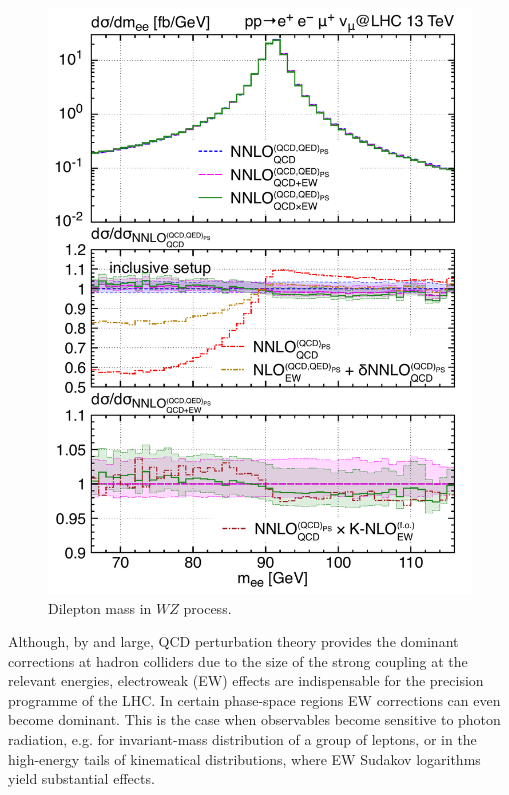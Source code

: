\documentclass{FBR_Bericht_2025}
\begin{document}
\begin{refsection}
\begin{figure}[b!]
\begin{center}
\includegraphics[width=0.95\linewidth]{plots/MiNNLO_EW_WZ_mZ.pdf}
\caption{Dilepton mass in $WZ$ process.}
\label{fig:WZ}
\end{center}
\end{figure}

Although, by and large, 
QCD perturbation theory provides the dominant corrections at hadron 
colliders due to the size of the strong coupling at the relevant energies, 
electroweak (EW) effects are indispensable for the precision programme of the LHC.
In certain phase-space regions EW corrections can even become dominant. This is the case
when observables become sensitive to photon radiation, e.g. for invariant-mass 
distribution of a group of leptons, or in the high-energy tails of kinematical distributions,
where EW Sudakov logarithms yield substantial effects.


\end{refsection}
\end{document}
